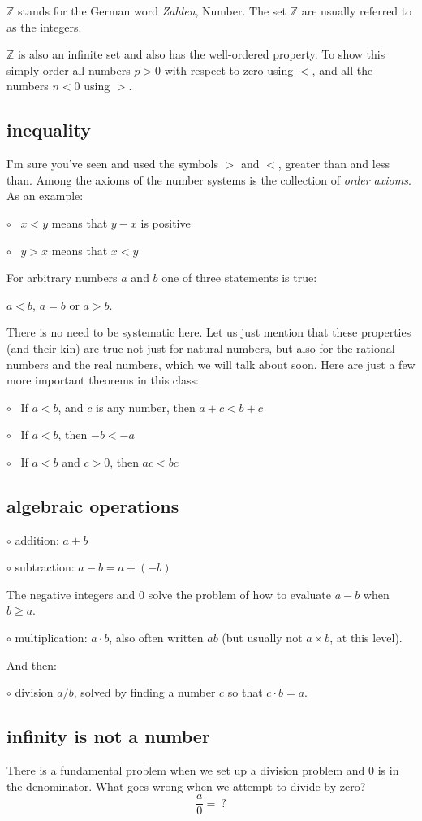 \documentclass[11pt, oneside]{article}
\begin{document}
$\mathbb{Z}$ stands for the German word \emph{Zahlen}, Number.  The set $\mathbb{Z}$ are usually referred to as the integers.

$\mathbb{Z}$ is also an infinite set and also has the well-ordered property.  To show this simply order all numbers $p > 0$ with respect to zero using $<$, and all the numbers $n < 0$ using $>$.

\subsection*{inequality}
I'm sure you've seen and used the symbols $>$ and $<$, greater than and less than.  Among the axioms of the number systems is the collection of \emph{order axioms}.  As an example:

$\circ$ \ $x < y$ means that $y - x$ is positive

$\circ$ \ $y > x$ means that $x < y$

For arbitrary numbers $a$ and $b$ one of three statements is true:  

$a < b$, $a = b$ or $a > b$.

There is no need to be systematic here.  Let us just mention that these properties (and their kin) are true not just for natural numbers, but also for the rational numbers and the real numbers, which we will talk about soon.  Here are just a few more important theorems in this class:

$\circ$ \ If $a < b$, and $c$ is any number, then $a + c < b + c$

$\circ$ \ If $a < b$, then $-b < -a$

$\circ$ \ If $a < b$ and $c > 0$, then $ac < bc$

\subsection*{algebraic operations}

$\circ$ addition:  $a + b$

$\circ$ subtraction:  $a - b = a + (-b)$

The negative integers and $0$ solve the problem of how to evaluate $a - b$ when $b \ge a$.

$\circ$ multiplication:  $a \cdot b$, also often written $ab$ (but usually not $a \times b$, at this level).

And then:

$\circ$ division $a/b$, solved by finding a number $c$ so that $c \cdot b = a$.

\subsection*{infinity is not a number}
There is a fundamental problem when we set up a division problem and $0$ is in the denominator.  What goes wrong when we attempt to divide by zero?
\[ \frac{a}{0} = \ ? \]
\end{document}
